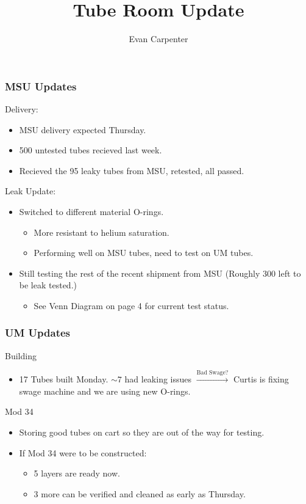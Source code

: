 \documentclass{beamer}
\title{Tube Room Update}
\author{Evan Carpenter}
\begin{document}
\begin{frame}
	\titlepage
\end{frame}

\begin{frame}
	\frametitle{MSU Updates}
	\begin{block}{Delivery:}
		\begin{itemize}
			\item MSU delivery expected Thursday.
			\item 500 untested tubes recieved last week.
			\item Recieved the 95 leaky tubes from MSU, retested, all passed. 
		\end{itemize}
	\end{block}
	\begin{block}{Leak Update:}
		\begin{itemize}
			\item Switched to different material O-rings.
			\begin{itemize}
				\item More resistant to helium saturation.
				\item Performing well on MSU tubes, need to test on UM tubes. 
			\end{itemize}
			\item Still testing the rest of the recent shipment from MSU (Roughly 300 left to be leak tested.)
			\begin{itemize}
				\item See Venn Diagram on page 4 for current test status.
			\end{itemize}  
		\end{itemize}
	\end{block}
\end{frame}
\begin{frame}
	\frametitle{UM Updates}
	\begin{block}{Building}
		\begin{itemize}
			\item 17 Tubes built Monday. $\sim 7$ had leaking issues $\xrightarrow{\text{Bad Swage?}}$ Curtis is fixing swage machine and we are using new O-rings.
		\end{itemize}
	\end{block}

	\begin{block}{Mod 34}
		\begin{itemize}
			\item Storing good tubes on cart so they are out of the way for testing. 
			\item If Mod 34 were to be constructed:
			\begin{itemize}
				\item 5 layers are ready now.
				\item 3 more can be verified and cleaned as early as Thursday. 
			\end{itemize}
		\end{itemize}
	\end{block}
\end{frame}
\end{document}

